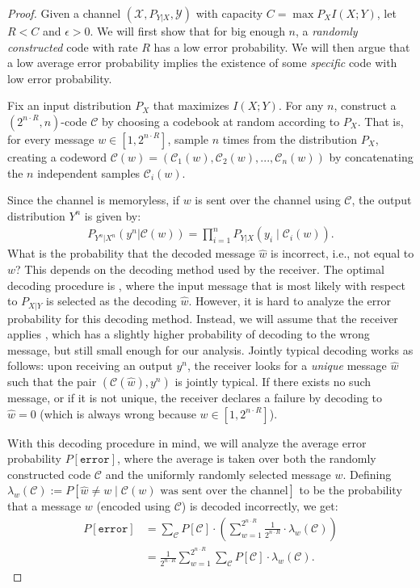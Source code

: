 \begin{proof}
\newcommand{\cran}{\ensuremath{\mathcal{C}}\xspace}
\newcommand{\xran}{\ensuremath{\mathcal{C}}\xspace}
\newcommand{\cspec}{\ensuremath{\mathcal{C}^*}\xspace}
\newcommand{\error}{\texttt{error}}
Given a channel $(\mathcal{X},P_{Y|X},\mathcal{Y})$ with capacity $C = \max{P_X} I(X;Y)$, let $R < C$ and $\epsilon > 0$. We will first show that for big enough $n$, a \emph{randomly constructed} code with rate $R$ has a low error probability. We will then argue that a low average error probability implies the existence of some \emph{specific} code with low error probability.

Fix an input distribution $P_X$ that maximizes $I(X;Y)$. For any $n$, construct a $(2^{n \cdot R},n)$-code \cran {} by choosing a codebook at random according to $P_X$. That is, for every message $w \in [1,2^{n \cdot R}]$, sample $n$ times from the distribution $P_X$, creating a codeword $\cran(w) = (\xran_1(w), \xran_2(w), ..., \xran_n(w))$ by concatenating the $n$ independent samples $\xran_i(w)$.

Since the channel is memoryless, if $w$ is sent over the channel using \cran, the output distribution $Y^n$ is given by:
\begin{align}
P_{Y^n|X^n}(y^n|\cran(w)) = \prod_{i=1}^n P_{Y|X} (y_i \mid \xran_i(w)).
\end{align}
What is the probability that the decoded message $\hat{w}$ is incorrect, i.e., not equal to $w$? This depends on the decoding method used by the receiver. The optimal decoding procedure is , where the input message that is most likely with respect to $P_{X|Y}$ is selected as the decoding $\hat{w}$. However, it is hard to analyze the error probability for this decoding method. Instead, we will assume that the receiver applies , which has a slightly higher probability of decoding to the wrong message, but still small enough for our analysis. Jointly typical decoding works as follows: upon receiving an output $y^n$, the receiver looks for a \emph{unique} message $\hat{w}$ such that the pair $(\cran(\hat{w}),y^n)$ is jointly typical. If there exists no such message, or if it is not unique, the receiver declares a failure by decoding to $\hat{w} = 0$ (which is always wrong because $w \in [1, 2^{n\cdot R}]$).

With this decoding procedure in mind, we will analyze the average error probability $P[\error]$, where the average is taken over both the randomly constructed code \cran and the uniformly randomly selected message $w$. Defining $\lambda_w(\cran) := P[\hat{w} \neq w \mid \cran(w) \text{ was sent over the channel}]$ to be the probability that a message $w$ (encoded using $\cran$) is decoded incorrectly, we get:
\begin{align}
P[\error] &= \sum_{\cran} P[\cran] \cdot \left(\sum_{w=1}^{2^{n\cdot R}} \frac{1}{2^{n \cdot R}} \cdot \lambda_w(\cran) \right)\nonumber\\
&= \frac{1}{2^{n \cdot R}} \sum_{w = 1}^{2^{n \cdot R}} \sum_{\cran} P[\cran] \cdot \lambda_w(\cran).\label{eq:prob-error}
\end{align}


\end{proof}
